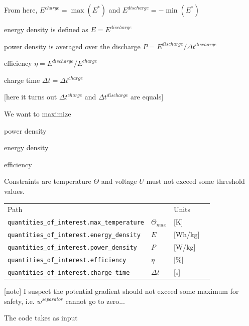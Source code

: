 \documentclass[10pt, oneside]{article}   	%
\begin{document}
From here, $E^{charge} = \max(E^*)$ and $E^{discharge} = - \min(E^*)$

energy density is defined as $E=E^{discharge}$

power density is averaged over the discharge $P=E^{discharge}/\Delta t^{discharge}$

efficiency $\eta=E^{discharge}/E^{charge}$

charge time $\Delta t=\Delta t^{charge}$

[here it turns out $\Delta t^{charge}$ and $\Delta t^{discharge}$ are equals]

We want to maximize 

power density 

energy density

efficiency

Constraints are 
temperature $\Theta$ and voltage $U$ must not exceed some threshold values.

{\footnotesize
\begin{tabular}{llll}
Path                      &     & Units \\
\texttt{quantities\_of\_interest.max\_temperature} & $\Theta_{max}$ & [K] \\
\texttt{quantities\_of\_interest.energy\_density}  & $E$            & [Wh/kg] \\
\texttt{quantities\_of\_interest.power\_density}   & $P$            & [W/kg] \\
\texttt{quantities\_of\_interest.efficiency}       & $\eta$         & [\%] \\
\texttt{quantities\_of\_interest.charge\_time}     & $\Delta t$     & [s]  \\
\end{tabular}
}


[note] 
I suspect the potential gradient should not exceed some maximum for safety,
i.e. $w^{separator}$ cannot go to zero...

The code takes as input
\end{document}
